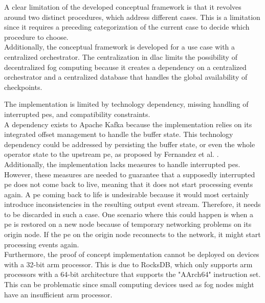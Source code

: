 A clear limitation of the developed conceptual framework is that it revolves around two distinct procedures, which address different cases. This is a limitation since it requires a preceding categorization of the current case to decide which procedure to choose.\\
Additionally, the conceptual framework is developed for a use case with a centralized orchestrator. The centralization in \gls{dlac} limits the possibility of decentralized fog computing because it creates a dependency on a centralized orchestrator and a centralized database that handles the global availability of checkpoints.\par

The implementation is limited by technology dependency, missing handling of interrupted \gls{pe}s, and compatibility constraints.\\
A dependency exists to Apache Kafka because the implementation relies on its integrated offset management to handle the buffer state. This technology dependency could be addressed by persisting the buffer state, or even the whole operator state to the upstream \gls{pe}, as proposed by Fernandez et al. \cite{CastroFernandez.2013}.\\
Additionally, the implementation lacks measures to handle interrupted \gls{pe}s. However, these measures are needed to guarantee that a supposedly interrupted \gls{pe} does not come back to live, meaning that it does not start processing events again. A \gls{pe} coming back to life is undesirable because it would most certainly introduce inconsistencies in the resulting output event stream. Therefore, it needs to be discarded in such a case. One scenario where this could happen is when a \gls{pe} is restored on a new node because of temporary networking problems on its origin node. If the \gls{pe} on the origin node reconnects to the network, it might start processing events again.\\
Furthermore, the proof of concept implementation cannot be deployed on devices with a 32-bit arm processor. This is due to RocksDB, which only supports arm processors with a 64-bit architecture that supports the "AArch64" instruction set. This can be problematic since small computing devices used as fog nodes might have an insufficient arm processor.\par

